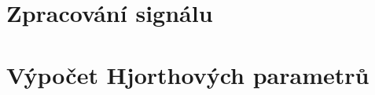 \section{Zpracování signálu}
\label{sec:zpracovani}

\section{Výpočet Hjorthových parametrů}
\label{sec:hjorth_parametery}

